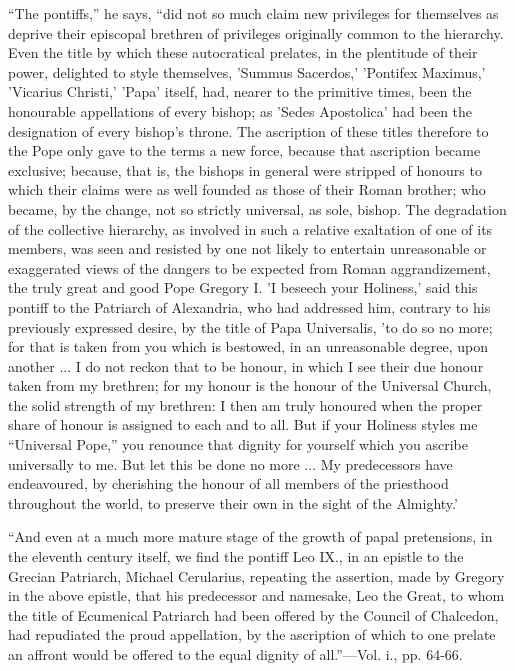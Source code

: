 ``The
pontiffs,'' he says, ``did not so much claim new privileges for themselves as deprive their
episcopal brethren of privileges originally common to the hierarchy.
Even the title by which these autocratical prelates, in the plentitude
of their power, delighted to style themselves, 'Summus Sacerdos,' 'Pontifex
Maximus,' 'Vicarius Christi,' 'Papa' itself, had, nearer to the
primitive times, been the honourable appellations of every bishop; as
'Sedes Apostolica' had been the designation of every bishop's throne.
The ascription of these titles therefore to the Pope only gave to the
terms a new force, because that ascription became exclusive; because,
that is, the bishops in general were stripped of honours to which
their claims were as well founded as those of their Roman brother; who
became, by the change, not so strictly universal, as sole, bishop. The
degradation of the collective hierarchy, as involved in such a
relative exaltation of one of its members, was seen and resisted by
one not likely to entertain unreasonable or exaggerated views of the
dangers to be expected from Roman aggrandizement, the truly great and
good Pope Gregory I. 'I beseech your Holiness,' said this pontiff to
the Patriarch of Alexandria, who had addressed him, contrary to his
previously expressed desire, by the title of Papa Universalis, 'to do
so no more; for that is taken from you which is bestowed, in an
unreasonable degree, upon another ... I do not reckon that to be
honour, in which I see their due honour taken from my brethren; for my
honour is the honour of the Universal Church, the solid strength of my
brethren: I then am truly honoured when the proper share of honour is
assigned to each and to all. But if your Holiness styles me ``Universal
Pope,'' you renounce that dignity for yourself which you ascribe
universally to me. But let this be done no more ... My predecessors
have endeavoured, by cherishing the honour of all members of the
priesthood throughout the world, to preserve their own in the sight of
the Almighty.'

``And
even at a much more mature stage of the growth of papal pretensions,
in the eleventh century itself, we find the pontiff Leo IX., in an
epistle to the Grecian Patriarch, Michael Cerularius, repeating the
assertion, made by Gregory in the above epistle, that his predecessor
and namesake, Leo the Great, to whom the title of Ecumenical Patriarch
had been offered by the Council of Chalcedon, had repudiated the proud
appellation, by the ascription of which to one prelate an affront
would be offered to the equal dignity of all.''—Vol. i., pp. 64-66.

